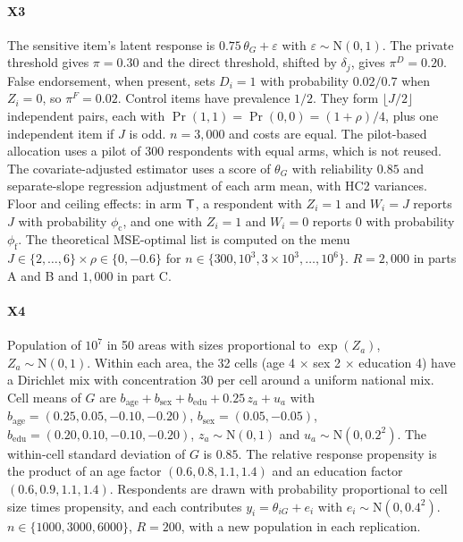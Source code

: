 \paragraph{X3}
The sensitive item's latent response is $0.75\,\theta_G+\varepsilon$ with $\varepsilon\sim\mathrm N(0,1)$. The private threshold gives $\pi=0.30$ and the direct threshold, shifted by $\delta_j$, gives $\pi^D=0.20$. False endorsement, when present, sets $D_i=1$ with probability $0.02/0.7$ when $Z_i=0$, so $\pi^F=0.02$. Control items have prevalence $1/2$. They form $\lfloor J/2\rfloor$ independent pairs, each with $\Pr(1,1)=\Pr(0,0)=(1+\rho)/4$, plus one independent item if $J$ is odd. $n=3{,}000$ and costs are equal. The pilot-based allocation uses a pilot of 300 respondents with equal arms, which is not reused. The covariate-adjusted estimator uses a score of $\theta_G$ with reliability $0.85$ and separate-slope regression adjustment of each arm mean, with HC2 variances. Floor and ceiling effects: in arm $\mathsf{T}$, a respondent with $Z_i=1$ and $W_i=J$ reports $J$ with probability $\phi_{\mathrm c}$, and one with $Z_i=1$ and $W_i=0$ reports $0$ with probability $\phi_{\mathrm f}$. The theoretical MSE-optimal list is computed on the menu $J\in\{2,\dots,6\}\times\rho\in\{0,-0.6\}$ for $n\in\{300,10^3,3\times10^3,\dots,10^6\}$. $R=2{,}000$ in parts A and B and $1{,}000$ in part C.

\paragraph{X4}
Population of $10^7$ in 50 areas with sizes proportional to $\exp(Z_a)$, $Z_a\sim\mathrm N(0,1)$. Within each area, the 32 cells (age 4 $\times$ sex 2 $\times$ education 4) have a Dirichlet mix with concentration $30$ per cell around a uniform national mix. Cell means of $G$ are $b_{\mathrm{age}}+b_{\mathrm{sex}}+b_{\mathrm{edu}}+0.25\,z_a+u_a$ with $b_{\mathrm{age}}=(0.25,0.05,-0.10,-0.20)$, $b_{\mathrm{sex}}=(0.05,-0.05)$, $b_{\mathrm{edu}}=(0.20,0.10,-0.10,-0.20)$, $z_a\sim\mathrm N(0,1)$ and $u_a\sim\mathrm N(0,0.2^2)$. The within-cell standard deviation of $G$ is $0.85$. The relative response propensity is the product of an age factor $(0.6,0.8,1.1,1.4)$ and an education factor $(0.6,0.9,1.1,1.4)$. Respondents are drawn with probability proportional to cell size times propensity, and each contributes $y_i=\theta_{iG}+e_i$ with $e_i\sim\mathrm N(0,0.4^2)$. $n\in\{1000,3000,6000\}$, $R=200$, with a new population in each replication.

